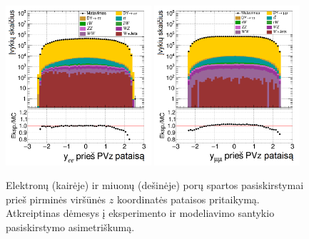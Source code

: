 \documentclass[a4paper, 12pt, oneside]{article}
\begin{document}
\begin{figure}[H]
	\includegraphics[width=0.48\textwidth]{ee_rapi_beforePVZ.png}
	\includegraphics[width=0.48\textwidth]{mumu_rapi_beforePVZ.png}
	\caption{\label{fig:rapibPVZ} Elektronų (kairėje) ir miuonų (dešinėje) porų spartos pasiskirstymai
		prieš pirminės viršūnės $z$ koordinatės pataisos pritaikymą.
		Atkreiptinas dėmesys į eksperimento ir modeliavimo santykio pasiskirstymo asimetriškumą.}
\end{figure}
\end{document}
